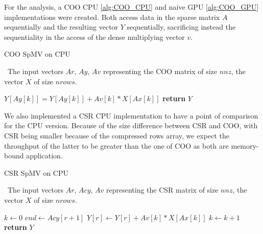\documentclass[conference]{IEEEtran}
\begin{document}


For the analysis, a COO CPU \ref{alg:COO_CPU} and  naive GPU \ref{alg:COO_GPU} implementations were created. Both access data in the sparse matrix $A$ sequentially and the resulting vector $Y$ sequentially, sacrificing instead the sequentiality in the access of the dense multiplying vector $v$.

\begin{algorithm}[h!]
	\caption{COO SpMV on CPU}
	\algorithmicrequire~The input vectors $Ar$, $Ay$, $Av$ representing the COO matrix of size $nnz$, the vector $X$ of size $nrows$.
	\begin{algorithmic}[1]
		\State $Y[Ay[k]] = Y[Ay[k]] + Av[k] * X[Ax[k]] $\label{partitioning}
		\EndFor
		\State \textbf{return} $Y$
		\EndProcedure
	\end{algorithmic}
	\label{alg:COO_CPU}
\end{algorithm}

We also implemented a CSR CPU implementation to have a point of comparison for the CPU version. Because of the size difference between CSR and COO, with CSR being smaller because of the compressed rows array, we expect the throughput of the latter to be greater than the one of COO as both are memory-bound application.

\begin{algorithm}[h!]
	\caption{CSR SpMV on CPU}
	\algorithmicrequire~The input vectors $Ar$, $Acy$, $Av$ representing the CSR matrix of size $nnz$, the vector $X$ of size $nrows$.
	\begin{algorithmic}[1]
		\State $k \leftarrow 0$
		\State $end \leftarrow Acy[r + 1]$
		\State $Y[r] \leftarrow Y[r] + Av[k] * X[Ax[k]] $\label{partitioning}
		\State $k \leftarrow k + 1$
		\EndWhile
		\EndFor
		\State \textbf{return} $Y$
		\EndProcedure
	\end{algorithmic}
	\label{alg:CSR_CPU}
\end{algorithm}
\end{document}
